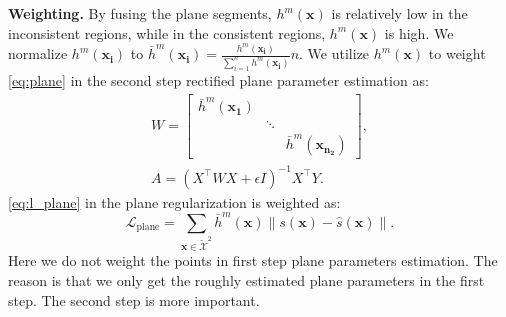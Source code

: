\documentclass[10pt,journal,compsoc]{IEEEtran}
\begin{document}
\noindent\textbf{Weighting.} By fusing the plane segments, $h^m(\bm{x})$ is relatively low in the inconsistent regions, while in the consistent regions, $h^m(\bm{x})$ is high. We normalize $h^m(\bm{x_i})$ to $\bar{h}^m(\bm{x_i}) = \frac{h^m(\bm{x_i})}{\sum_{i=1}^n h^m(\bm{x_i})}n$. We utilize $h^m(\bm{x})$ to weight \cref{eq:plane} in the second step rectified plane parameter estimation as:
\begin{align}
	W=\begin{bmatrix}
		\bar{h}^m(\bm{x_1}) & &\\& \ddots &\\& & \bar{h}^m(\bm{x_{n_2}})
	\end{bmatrix},\\
	A=\left(X^{\top}W X+\epsilon I\right)^{-1} X^{\top} Y.
\end{align}
\cref{eq:l_plane} in the plane regularization is weighted as:
\begin{equation}
	\mathcal{L}_{\text{plane}} = \sum_{\bm{x} \in {\tilde{\mathcal{X}}}^2} \bar{h}^m(\bm{x})\|s(\bm{x}) - \hat{s}(\bm{x})\|.
\end{equation}
Here we do not weight the points in first step plane parameters estimation. The reason is that we only get the roughly estimated plane parameters in the first step. The second step is more important.
\end{document}
